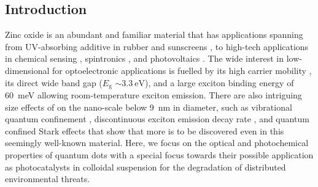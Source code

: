 \documentclass[9pt,twoside,twocolumn]{article}\usepackage{knitr}
\begin{document}
\begin{refsection}



\section{Introduction}

Zinc oxide is an abundant and familiar material that has applications spanning from UV-absorbing additive in rubber \cite{Heideman2005} and sunscreens \cite{King2005,Serpone2007}, to high-tech applications in chemical sensing \cite{Rambu2013,Cai2013}, spintronics \cite{Sharma2004}, and photovoltaics \cite{Quintana2007,Boschloo2006}.
The wide interest in low-dimensional  for optoelectronic applications is fuelled by its high carrier mobility \cite{Yoshikawa1997,Look1998,Kaidashev2003}, its direct wide band gap ($E_\text{g}$ $\sim\qty{3.3}{\eV}$), and a large exciton binding energy of \qty{60}{\meV} \cite{Ozgur2005} allowing room-temperature exciton emission.
There are also intriguing size effects of  on the nano-scale below \qty{9}{\nm} in diameter, such as vibrational quantum confinement \cite{Raymand2012}, discontinuous exciton emission decay rate \cite{Jacobsson2014}, and quantum confined Stark effects \cite{Jacobsson2014a} that show that more is to be discovered even in this seemingly well-known material.
Here, we focus on the optical and photochemical properties of  quantum dots with a special focus towards their possible application as photocatalysts in colloidal suspension for the degradation of distributed environmental threats.


\end{refsection}
\end{document}
